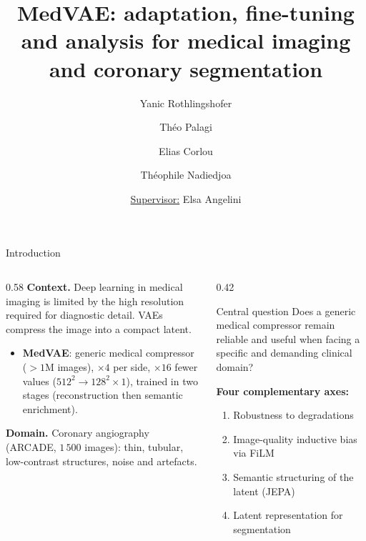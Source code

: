 \documentclass[aspectratio=169]{beamer}
\title[MedVAE — Coronary segmentation]{MedVAE: adaptation, fine-tuning and analysis for medical imaging and coronary segmentation}
\author[Rothlingshofer, Palagi, Corlou, Nadiedjoa]{Yanic Rothlingshofer  \and Théo Palagi \and Elias Corlou \and Théophile Nadiedjoa}
\institute[]{\large \it Télécom Paris}
\date{\underline{Supervisor:} Elsa Angelini}
\begin{document}
\maketitle

\begin{frame}{Introduction}
  \begin{columns}[T]
  \begin{column}{0.58\textwidth}
  \textbf{Context.} Deep learning in medical imaging is limited by the high
  resolution required for diagnostic detail. VAEs compress the image into a
  compact latent.
  \begin{itemize}
    \item \textbf{MedVAE}: generic medical compressor ($>1$M images),
      $\times 4$ per side, $\times 16$ fewer values ($512^2 \to 128^2 \times 1$), trained in two stages
      (reconstruction then semantic enrichment).
  \end{itemize}
  \vspace{0.4em}
  \textbf{Domain.} Coronary angiography (ARCADE, $1\,500$ images):
  thin, tubular, low-contrast structures, noise and artefacts.
  \end{column}
  \begin{column}{0.42\textwidth}
  \begin{block}{Central question}
  Does a generic medical compressor remain \alert{reliable and useful} when
  facing a specific and demanding clinical domain?
  \end{block}
  \vspace{0.2em}
  \footnotesize \textbf{Four complementary axes:}
  \begin{enumerate}
    \item Robustness to degradations
    \item Image-quality inductive bias via FiLM
    \item Semantic structuring of the latent (JEPA)
    \item Latent representation for segmentation
  \end{enumerate}
  \end{column}
  \end{columns}
\end{frame}

\end{document}
